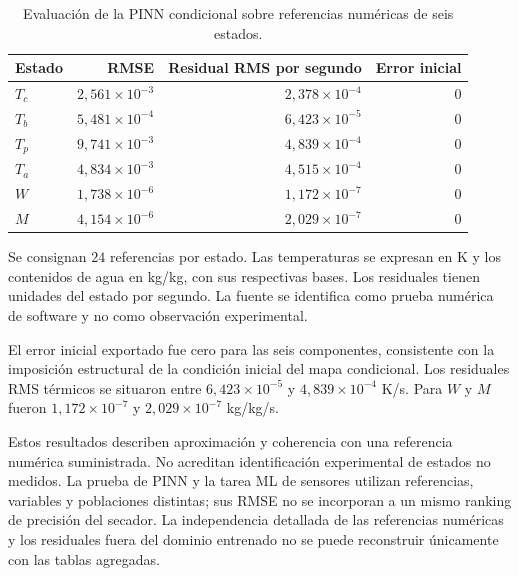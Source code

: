 \begin{table}[htbp]
\centering
\caption{Evaluación de la PINN condicional sobre referencias numéricas de seis estados.}
\label{tab:res_pinn}
\small
\setlength{\tabcolsep}{5pt}
\begin{tabular}{lrrr}
\toprule
Estado & RMSE & Residual RMS por segundo & Error inicial \\
\midrule
$T_c$ & $2{,}561\times10^{-3}$ & $2{,}378\times10^{-4}$ & $0$ \\
$T_b$ & $5{,}481\times10^{-4}$ & $6{,}423\times10^{-5}$ & $0$ \\
$T_p$ & $9{,}741\times10^{-3}$ & $4{,}839\times10^{-4}$ & $0$ \\
$T_a$ & $4{,}834\times10^{-3}$ & $4{,}515\times10^{-4}$ & $0$ \\
$W$ & $1{,}738\times10^{-6}$ & $1{,}172\times10^{-7}$ & $0$ \\
$M$ & $4{,}154\times10^{-6}$ & $2{,}029\times10^{-7}$ & $0$ \\
\bottomrule
\end{tabular}
\par\vspace{3pt}
\begin{minipage}{0.98\textwidth}\footnotesize
Se consignan $24$ referencias por estado. Las temperaturas se expresan en K y los contenidos de agua en kg/kg, con sus respectivas bases. Los residuales tienen unidades del estado por segundo. La fuente se identifica como prueba numérica de software y no como observación experimental.
\end{minipage}
\end{table}


El error inicial exportado fue cero para las seis componentes, consistente con la imposición estructural de la condición inicial del mapa condicional. Los residuales RMS térmicos se situaron entre $6{,}423\times10^{-5}$ y $4{,}839\times10^{-4}$ K/s. Para $W$ y $M$ fueron $1{,}172\times10^{-7}$ y $2{,}029\times10^{-7}$ kg/kg/s.

Estos resultados describen aproximación y coherencia con una referencia numérica suministrada. No acreditan identificación experimental de estados no medidos. La prueba de PINN y la tarea ML de sensores utilizan referencias, variables y poblaciones distintas; sus RMSE no se incorporan a un mismo ranking de precisión del secador. La independencia detallada de las referencias numéricas y los residuales fuera del dominio entrenado no se puede reconstruir únicamente con las tablas agregadas.

